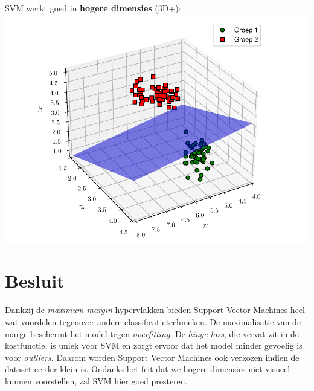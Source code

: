 \documentclass[kulak]{kulakposter}
\begin{document}
\begin{multicols}{3}
		\vfill \null
		
		\columnbreak
		
		\vfill \null
		
		\centering
		SVM werkt goed in \textbf{hogere dimensies} (3D+):\\
		\includegraphics[width=.9\columnwidth]{3d}
		
	\end{multicols}


\section*{Besluit}

Dankzij de \textit{maximum margin} hypervlakken bieden Support Vector Machines heel wat voordelen tegenover andere classificatietechnieken. De maximalisatie van de marge beschermt het model tegen \textit{overfitting}. De \textit{hinge loss}, die vervat zit in de kostfunctie, is uniek voor SVM en zorgt ervoor dat het model minder gevoelig is voor \textit{outliers}. Daarom worden Support Vector Machines ook verkozen indien de dataset eerder klein is. Ondanks het feit dat we hogere dimensies niet visueel kunnen voorstellen, zal SVM hier goed presteren.

\nocite{mediumarticle}
\nocite{Ramo_2017}



\end{document}
